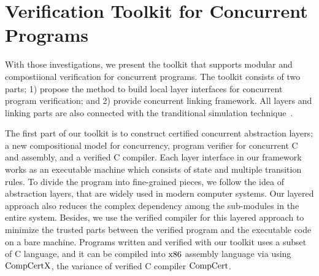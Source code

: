 \section{Verification Toolkit for Concurrent Programs}
\label{chapter:introduction:sec:verification-toolkit-for-concurrent-programs}
%
With those investigations, we present the toolkit that supports modular and compostiional 
verification  for concurrent programs. 
The toolkit consists of two parts;
1) propose the method to build  local layer interfaces for concurrent program verification;
and 2) provide concurrent linking framework.
All layers and linking parts are also connected with the tranditional simulation technique~\cite{compcert, deepspec}. 
 
The first part of our toolkit is to construct certified concurrent 
abstraction layers;
a new compositional model for concurrency, program verifier for concurrent C and assembly,
and a verified C compiler.
Each layer interface in our framework 
works as an executable machine which consists of state and multiple transition rules.
To divide the program into fine-grained pieces,
we follow the idea of 
abstraction layers,
that are widely used in modern computer systems.
Our layered approach also reduces
the complex dependency 
among the sub-modules in the entire system.
Besides, we use the verified compiler for this layered approach to minimize the trusted parts between the verified program and the executable code on a bare machine. 
Programs written and verified with our toolkit uses a subset of C language, 
and it can be compiled into $\mathrm{x86}$ assembly language via using $\mathrm{CompCertX}$, the variance of verified C compiler $\mathrm{CompCert}$. 

